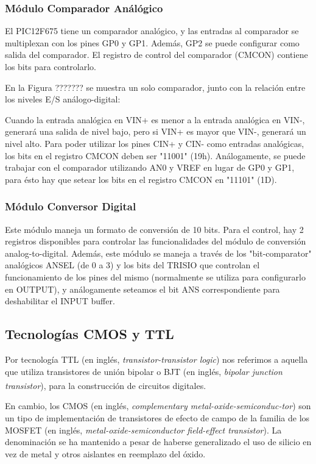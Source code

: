 \documentclass[a4paper]{article}
\let\originalcite\cite
\renewcommand{\cite}[2][]{\textsuperscript{\originalcite{#2}}}
\begin{document}
\subsubsection*{Módulo Comparador Análógico}

El PIC12F675 tiene un comparador analógico, y las entradas al
comparador se multiplexan con los pines GP0 y GP1.
Además, GP2 se puede configurar como salida del comparador.
El registro de control del comparador (CMCON) contiene
los bits para controlarlo.
	
En la Figura ??????? se muestra un solo comparador, junto con
la relación entre los niveles E/S análogo-digital:
		
Cuando la entrada analógica en VIN+ es menor a la entrada
analógica en VIN-, generará una salida de nivel bajo, pero si VIN+
es mayor que VIN-, generará un nivel alto.
Para poder utilizar los pines CIN+ y CIN- como entradas analógicas,
los bits en el registro CMCON deben ser "11001" (19h).
Análogamente, se puede trabajar con el comparador
utilizando AN0 y VREF en lugar de GP0 y GP1, para ésto
hay que setear los bits en el registro CMCON en "11101" (1D).

\subsubsection*{Módulo Conversor Digital}

Este módulo maneja un formato de conversión de 10 bits. Para el control,
hay 2 registros disponibles para controlar las funcionalidades
del módulo de conversión analog-to-digital.
Además, este módulo se maneja a través de los "bit-comparator" analógicos
ANSEL (de 0 a 3) y los bits del TRISIO que controlan el funcionamiento
de los pines del mismo (normalmente se utiliza para configurarlo en OUTPUT),
y análogamente seteamos el bit ANS correspondiente para deshabilitar el INPUT buffer.
	
\subsection*{Tecnologías CMOS y TTL}

Por tecnología TTL (en inglés, \textit{transistor-transistor logic})
nos referimos a aquella que utiliza transistores de unión bipolar o 
BJT (en inglés, \textit{bipolar junction transistor}), para la 
construcción de circuitos digitales\cite{bib:boylestad}.

En cambio, los CMOS (en inglés, \textit{complementary 
metal-oxide-semiconduc-tor}) son un tipo de implementación de 
transistores de efecto de campo de la familia de los MOSFET (en 
inglés, \textit{metal-oxide-semiconductor field-effect transistor}). 
La denominación se ha mantenido a pesar de haberse generalizado el 
uso de silicio en vez de metal y otros aislantes en reemplazo del 
óxido.
\end{document}
